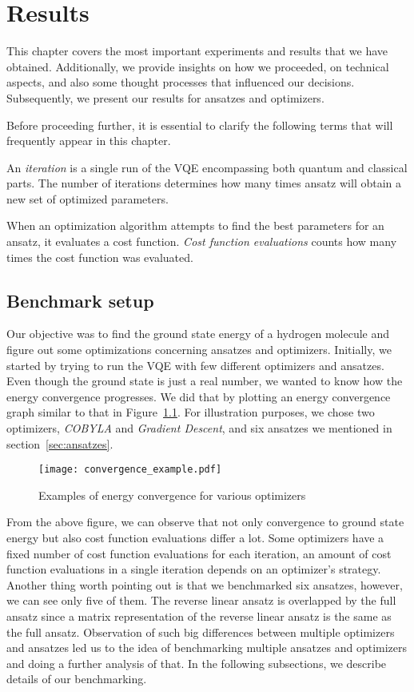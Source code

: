 \chapter{Results}\label{ch:results}
This chapter covers the most important experiments and results that we have obtained. Additionally, we provide insights on how we proceeded, on technical aspects, and also some thought processes that influenced our decisions. Subsequently, we present our results for ansatzes and optimizers.

Before proceeding further, it is essential to clarify the following terms that will frequently appear in this chapter.

An \textit{iteration} is a single run of the VQE encompassing both quantum and classical parts. The number of iterations determines how many times ansatz will obtain a new set of optimized parameters.

When an optimization algorithm attempts to find the best parameters for an ansatz, it evaluates a cost function. \textit{Cost function evaluations} counts how many times the cost function was evaluated.

\section{Benchmark setup}
Our objective was to find the ground state energy of a hydrogen molecule and figure out some optimizations concerning ansatzes and optimizers. Initially, we started by trying to run the VQE with few different optimizers and ansatzes. Even though the ground state is just a real number, we wanted to know how the energy convergence progresses. We did that by plotting an energy convergence graph similar to that in Figure~\ref{fig:energy-convergence}. For illustration purposes, we chose two optimizers, \textit{COBYLA} and \textit{Gradient Descent}, and six ansatzes we mentioned in section~\ref{sec:ansatzes}.
\begin{figure}[H]
    \centering
    \texttt{[image: convergence\_example.pdf]}
    \caption{Examples of energy convergence for various optimizers}
    \label{fig:energy-convergence}
\end{figure}
From the above figure, we can observe that not only convergence to ground state energy but also cost function evaluations differ a lot. Some optimizers have a fixed number of cost function evaluations for each iteration, an amount of cost function evaluations in a single iteration depends on an optimizer's strategy. Another thing worth pointing out is that we benchmarked six ansatzes, however, we can see only five of them. The reverse linear ansatz is overlapped by the full ansatz since a matrix representation of the reverse linear ansatz is the same as the full ansatz. Observation of such big differences between multiple optimizers and ansatzes led us to the idea of benchmarking multiple ansatzes and optimizers and doing a further analysis of that. In the following subsections, we describe details of our benchmarking.

